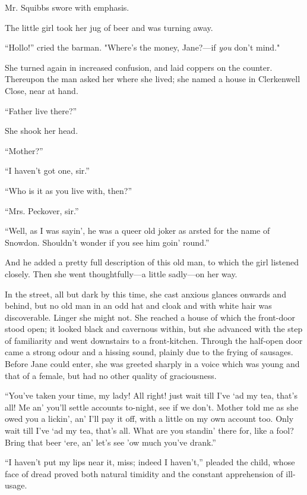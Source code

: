 Mr. Squibbs swore with emphasis.

The little girl took her jug of beer and was turning away.

``Hollo!'' cried the barman. "Where's the money, Jane?---if \emph{you}
don't mind."

{\protect\hypertarget{9}{}{}}She turned again in increased confusion,
and laid coppers on the counter. Thereupon the man asked her where she
lived; she named a house in Clerkenwell Close, near at hand.

``Father live there?''

She shook her head.

``Mother?''

``I haven't got one, sir.''

``Who is it as you live with, then?''

``Mrs. Peckover, sir.''

``Well, as I was sayin', he was a queer old joker as arsted for the name
of Snowdon. Shouldn't wonder if you see him goin' round.''

And he added a pretty full description of this old man, to which the
girl listened closely. Then she went thoughtfully---a little sadly---on
her way.

In the street, all but dark by this time, she cast anxious glances
onwards and behind, but no old man in an odd hat and cloak and with
white hair was discoverable. Linger she might not. She reached a house
of which the front-door stood open; it looked
{\protect\hypertarget{10}{}{}}black and cavernous within, but she
advanced with the step of familiarity and went downstairs to a
front-kitchen. Through the half-open door came a strong odour and a
hissing sound, plainly due to the frying of sausages. Before Jane could
enter, she was greeted sharply in a voice which was young and that of a
female, but had no other quality of graciousness.

``You've taken your time, my lady! All right! just wait till I've `ad my
tea, that's all! Me an' you'll settle accounts to-night, see if we
don't. Mother told me as she owed you a lickin', an' I'll pay it off,
with a little on my own account too. Only wait till I've `ad my tea,
that's all. What are you standin' there for, like a fool? Bring that
beer `ere, an' let's see 'ow much you've drank.''

``I haven't put my lips near it, miss; indeed I haven't,'' pleaded the
child, whose face of dread proved both natural timidity and the constant
apprehension of ill-usage.

